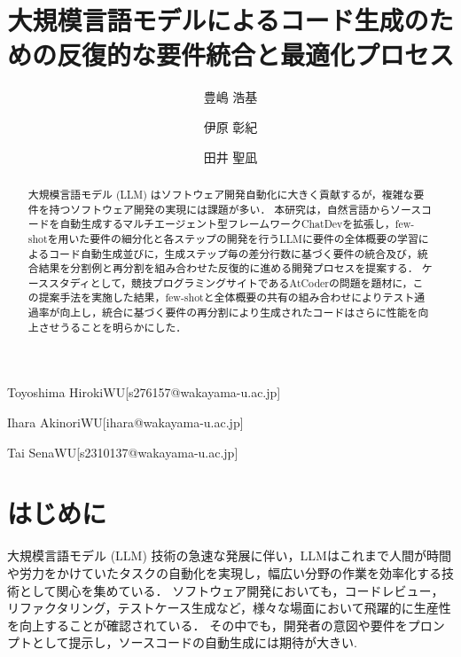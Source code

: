 \documentclass[submit,techrep,noauthor]{ipsj}
\begin{document}
\title{大規模言語モデルによるコード生成のための反復的な要件統合と最適化プロセス\\}




\author{豊嶋 浩基}{Toyoshima Hiroki}{WU}[s276157@wakayama-u.ac.jp]
\author{伊原 彰紀}{Ihara Akinori}{WU}[ihara@wakayama-u.ac.jp]
\author{田井 聖凪}{Tai Sena}{WU}[s2310137@wakayama-u.ac.jp]

\begin{abstract}
大規模言語モデル (LLM) はソフトウェア開発自動化に大きく貢献するが，複雑な要件を持つソフトウェア開発の実現には課題が多い．
本研究は，自然言語からソースコードを自動生成するマルチエージェント型フレームワークChatDevを拡張し，few-shotを用いた要件の細分化と各ステップの開発を行うLLMに要件の全体概要の学習によるコード自動生成並びに，生成ステップ毎の差分行数に基づく要件の統合及び，統合結果を分割例と再分割を組み合わせた反復的に進める開発プロセスを提案する．
ケーススタディとして，競技プログラミングサイトであるAtCoderの問題を題材に，この提案手法を実施した結果，few-shotと全体概要の共有の組み合わせによりテスト通過率が向上し，統合に基づく要件の再分割により生成されたコードはさらに性能を向上させうることを明らかにした．

\end{abstract}

\maketitle

\section{はじめに}

大規模言語モデル (LLM) 技術の急速な発展に伴い\cite{Growing_LLM}，LLMはこれまで人間が時間や労力をかけていたタスクの自動化を実現し，幅広い分野の作業を効率化する技術として関心を集めている．
ソフトウェア開発においても，コードレビュー，リファクタリング，テストケース生成など，様々な場面において飛躍的に生産性を向上することが確認されている．\cite{LLM_CodeReview}\cite{LLM_Refactoring}\cite{LLM_Gene_Test}
その中でも，開発者の意図や要件をプロンプトとして提示し，ソースコードの自動生成には期待が大きい.\cite{LLM_CodeGeneration}
\end{document}
